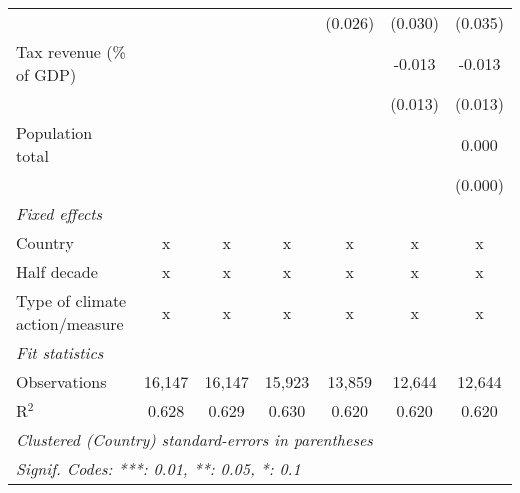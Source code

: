 \begin{tabular}{lcccccc}
                                               &              &              &              & (0.026)       & (0.030)       & (0.035)\\   
   Tax revenue (\% of GDP)                     &              &              &              &               & -0.013        & -0.013\\   
                                               &              &              &              &               & (0.013)       & (0.013)\\   
   Population total                            &              &              &              &               &               & 0.000\\   
                                               &              &              &              &               &               & (0.000)\\   
   \emph{Fixed effects}\\
   Country                                     & x            & x            & x            & x             & x             & x\\  
   Half decade                                 & x            & x            & x            & x             & x             & x\\  
   Type of climate action/measure              & x            & x            & x            & x             & x             & x\\  
   \midrule \emph{Fit statistics}\\
   Observations                                & 16,147       & 16,147       & 15,923       & 13,859        & 12,644        & 12,644\\  
   R$^2$                                       & 0.628        & 0.629        & 0.630        & 0.620         & 0.620         & 0.620\\  
   \midrule
   \multicolumn{7}{l}{\emph{Clustered (Country) standard-errors in parentheses}}\\
   \multicolumn{7}{l}{\emph{Signif. Codes: ***: 0.01, **: 0.05, *: 0.1}}\\
\end{tabular}
\par\endgroup


